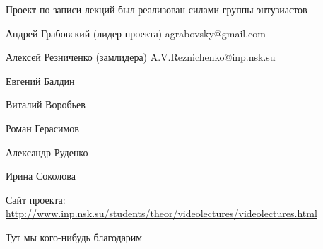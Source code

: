 \documentclass[12pt,pagesize,paper=192mm:108mm]{scrbook}
\begin{document}
\vspace*{0em}
%

  \begin{center}    
  \vfill

    \begin{minipage}{0.7\linewidth}
      Проект по записи лекций был реализован силами группы энтузиастов
\bigskip

Андрей Грабовский (лидер проекта) agrabovsky@gmail.com

Алексей Резниченко (замлидера) A.V.Reznichenko@inp.nsk.su

Евгений Балдин 

Виталий Воробьев 

Роман Герасимов

Александр Руденко

Ирина Соколова
\bigskip

\begin{flushleft}
  Сайт проекта:
  \url{http://www.inp.nsk.su/students/theor/videolectures/videolectures.html}
\end{flushleft}
    \end{minipage}
    \vfill

  \end{center}
\newpage

\vspace*{0em}
\vfill
\begin{center}
  Тут мы кого-нибудь благодарим
\end{center}
\vfill
\end{document}
